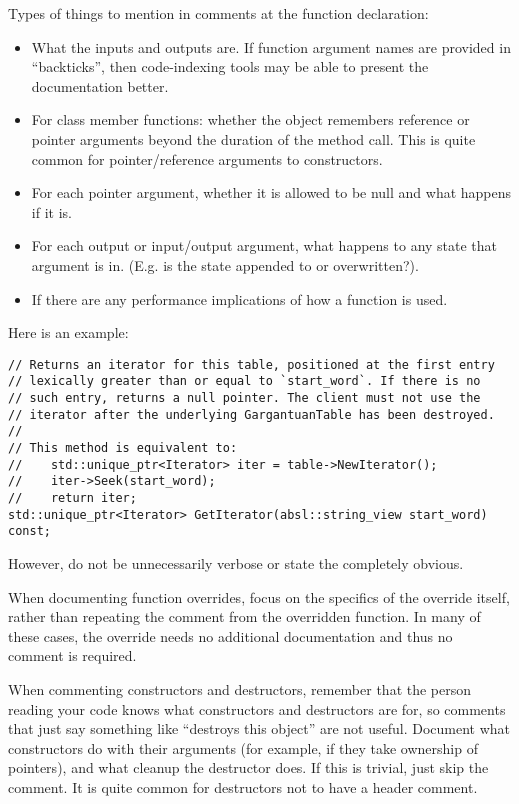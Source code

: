     Types of things to mention in comments at the function declaration:
    \begin{itemize}
        \item What the inputs and outputs are. If function argument names are provided in \enquote{backticks}, then code-indexing tools may be able to present the documentation better.
        \item For class member functions: whether the object remembers reference or pointer arguments beyond the duration of the method call. This is quite common for pointer/reference arguments to constructors.
        \item For each pointer argument, whether it is allowed to be null and what happens if it is.
        \item For each output or input/output argument, what happens to any state that argument is in. (E.g. is the state appended to or overwritten?).
        \item If there are any performance implications of how a function is used.
    \end{itemize}
    Here is an example:
    \begin{verbatim}
// Returns an iterator for this table, positioned at the first entry
// lexically greater than or equal to `start_word`. If there is no
// such entry, returns a null pointer. The client must not use the
// iterator after the underlying GargantuanTable has been destroyed.
//
// This method is equivalent to:
//    std::unique_ptr<Iterator> iter = table->NewIterator();
//    iter->Seek(start_word);
//    return iter;
std::unique_ptr<Iterator> GetIterator(absl::string_view start_word) const;
    \end{verbatim}

    However, do not be unnecessarily verbose or state the completely obvious.

    When documenting function overrides, focus on the specifics of the override itself, rather than repeating the comment from the overridden function. In many of these cases, the override needs no additional documentation and thus no comment is required.

    When commenting constructors and destructors, remember that the person reading your code knows what constructors and destructors are for, so comments that just say something like \enquote{destroys this object} are not useful. Document what constructors do with their arguments (for example, if they take ownership of pointers), and what cleanup the destructor does. If this is trivial, just skip the comment. It is quite common for destructors not to have a header comment.


